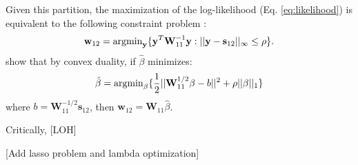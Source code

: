 Given this partition, the maximization of the log-likelihood (Eq. \ref{eq:likelihood}) is equivalent to the following constraint problem \cite{banerjee2008}:
\begin{align}
\textbf{w}_{12}=\operatorname{argmin}_{\textbf{y}} \{ \textbf{y}^T \textbf{W}_{11} ^{-1} \textbf{y} : ||\textbf{y}-\textbf{s}_{12}||_{\infty} \leq \rho \}.
\end{align}
\cite{banerjee2008} show that by convex duality, if $\hat{\beta}$ minimizes:
\begin{align}
\hat{\beta}=\operatorname{argmin}_{\beta} \{\frac{1}{2} ||\textbf{W}_{11}^{1/2}\beta-b||^2 +\rho ||\beta||_1 \}
\label{eq:dual}
\end{align}
where $b=\textbf{W}_{11}^{-1/2} \textbf{s}_{12}$, then $\textbf{w}_{12}=\textbf{W}_{11} \hat{\beta}$.

Critically, \cite{friedman2007} [LOH]

[Add lasso problem and lambda optimization]

